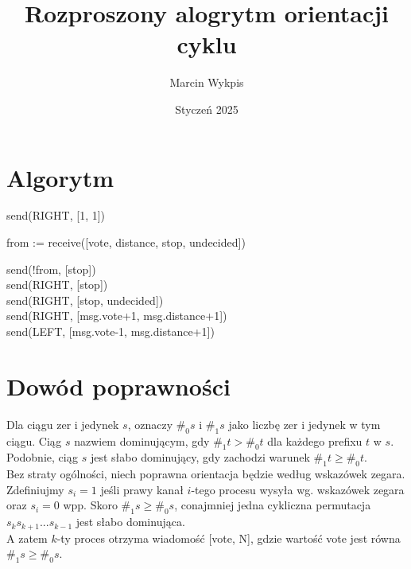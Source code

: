 \documentclass{article}
\title{Rozproszony alogrytm orientacji cyklu}
\author{Marcin Wykpis}
\date{Styczeń 2025}
\begin{document}
\maketitle

\section{Algorytm}
\begin{algorithm}[H]
send(RIGHT, [1, 1])\\
{
    from := receive([vote, distance, stop, undecided])

    {
        send(!from, [stop])\\
        {
        } 
        {
        } \Else
        {
        }
    }
    {
        {
            {
                send(RIGHT, [stop])\\
            }{
                send(RIGHT, [stop, undecided])\\
            }
        }
        {
            send(RIGHT, [msg.vote+1, msg.distance+1])\\
        }
        {
            send(LEFT, [msg.vote-1, msg.distance+1])\\
        }
    } 
}
\end{algorithm}

\newpage
\section{Dowód poprawności}
Dla ciągu zer i jedynek $s$, oznaczy $\#_0 s$ i $\#_1 s$ jako liczbę zer i jedynek w tym ciągu.
Ciąg $s$ nazwiem dominującym, gdy $\#_1 t > \#_0 t$ dla każdego prefixu $t$ w $s$.\\
Podobnie, ciąg $s$ jest słabo dominujący, gdy zachodzi warunek $\#_1 t \ge \#_0 t$.\\
Bez straty ogólności, niech poprawna orientacja będzie według wskazówek zegara.\\
Zdefiniujmy $s_i = 1$ jeśli prawy kanał $i$-tego procesu wysyła wg. wskazówek zegara oraz $s_i=0$ wpp.
Skoro $\#_1 s \ge \#_0 s$, conajmniej jedna cykliczna permutacja $s_k s_{k+1} ... s_{k-1}$ jest słabo dominująca.\\
A zatem $k$-ty proces otrzyma wiadomość [vote, N], gdzie wartość vote jest równa  $\#_1 s \ge \#_0 s$.
\end{document}
